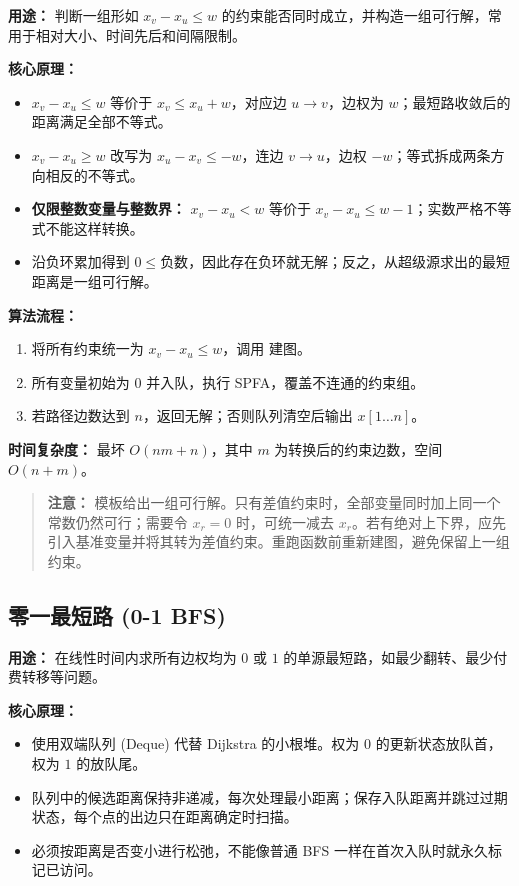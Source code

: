 \textbf{用途：} 判断一组形如 $x_v-x_u\le w$ 的约束能否同时成立，并构造一组可行解，常用于相对大小、时间先后和间隔限制。

\textbf{核心原理：}
\begin{itemize}
  \item $x_v-x_u\le w$ 等价于 $x_v\le x_u+w$，对应边 $u\to v$，边权为 $w$；最短路收敛后的距离满足全部不等式。
  \item $x_v-x_u\ge w$ 改写为 $x_u-x_v\le -w$，连边 $v\to u$，边权 $-w$；等式拆成两条方向相反的不等式。
  \item \textbf{仅限整数变量与整数界：} $x_v-x_u<w$ 等价于 $x_v-x_u\le w-1$；实数严格不等式不能这样转换。
  \item 沿负环累加得到 $0\le\text{负数}$，因此存在负环就无解；反之，从超级源求出的最短距离是一组可行解。
\end{itemize}

\textbf{算法流程：}
\begin{enumerate}
  \item 将所有约束统一为 $x_v-x_u\le w$，调用  建图。
  \item 所有变量初始为 $0$ 并入队，执行 SPFA，覆盖不连通的约束组。
  \item 若路径边数达到 $n$，返回无解；否则队列清空后输出 $x[1\ldots n]$。
\end{enumerate}

\textbf{时间复杂度：} 最坏 $O(nm+n)$，其中 $m$ 为转换后的约束边数，空间 $O(n+m)$。

\begin{quote}
\textbf{注意：} 模板给出一组可行解。只有差值约束时，全部变量同时加上同一个常数仍然可行；需要令 $x_r=0$ 时，可统一减去 $x_r$。若有绝对上下界，应先引入基准变量并将其转为差值约束。重跑函数前重新建图，避免保留上一组约束。
\end{quote}



\subsection{零一最短路 (0-1 BFS)}

\textbf{用途：} 在线性时间内求所有边权均为 $0$ 或 $1$ 的单源最短路，如最少翻转、最少付费转移等问题。

\textbf{核心原理：}
\begin{itemize}
  \item 使用双端队列 (Deque) 代替 Dijkstra 的小根堆。权为 $0$ 的更新状态放队首，权为 $1$ 的放队尾。
  \item 队列中的候选距离保持非递减，每次处理最小距离；保存入队距离并跳过过期状态，每个点的出边只在距离确定时扫描。
  \item 必须按距离是否变小进行松弛，不能像普通 BFS 一样在首次入队时就永久标记已访问。
\end{itemize}

